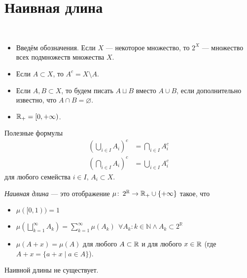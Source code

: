 \section{Наивная длина}

\begin{df}\
 \begin{itemize}
  \item Введём обозначения. Если $ X $ --- некоторое множество, то $ 2^X $ --- множество всех подмножеств множества $ X $.
  \item Если $ A \subset X $, то $ A^c = X \setminus A $.
  \item Если $ A, B \subset X $, то будем писать $ A \sqcup B $ вместо $ A \cup B $, если дополнительно известно, что $ A \cap B = \varnothing $.
  \item $ \mathbb{R}_+ = [0, +\infty) $.
 \end{itemize}
\end{df}
\begin{prop}
 Полезные формулы
 \begin{align*}
  \left( \bigcup_{i \in I} A_i \right)^c &= \bigcap_{i \in I} A_i^c \\
  \left( \bigcap_{i \in I} A_i \right)^c &= \bigcup_{i \in I} A_i^c
 \end{align*} для любого семейства $ i \in I $, $ A_i \subset X $.
\end{prop}
\begin{df}
 \textit{Наивная длина} --- это отображение $ \mu \colon\, 2^\mathbb{R} \to \mathbb{R}_+ \cup \{ +\infty \} $ такое, что
 \begin{itemize}
  \item $ \mu ([0, 1)) = 1 $
  \item $ \displaystyle \mu\left( \bigsqcup_{k=1}^\infty A_k \right) = \sum_{k=1}^\infty \mu( A_k ) \ \ \forall { A_k } : {k \in \mathbb{N}} \land {A_k \subset 2^{\mathbb{R}}} $
  \item $ \mu(A + x) = \mu(A) $ для любого $ A \subset \mathbb{R} $ и для любого $ x \in \mathbb{R} $ (где $ A + x = \{ a + x \mid a \in A \} $).
 \end{itemize}
\end{df}
\begin{thm}
 Наивной длины не существует.
\end{thm}
